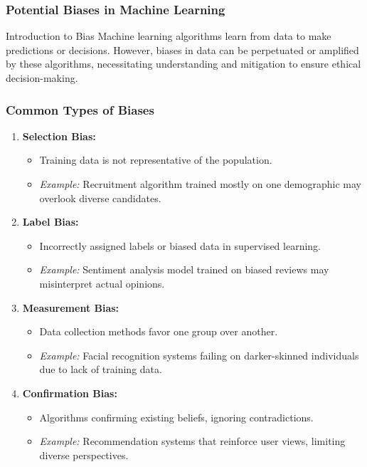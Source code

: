 \documentclass[aspectratio=169]{beamer}
\begin{document}
\begin{frame}[fragile]
    \frametitle{Potential Biases in Machine Learning}
    \begin{block}{Introduction to Bias}
        Machine learning algorithms learn from data to make predictions or decisions. However, biases in data can be perpetuated or amplified by these algorithms, necessitating understanding and mitigation to ensure ethical decision-making.
    \end{block}
\end{frame}

\begin{frame}[fragile]
    \frametitle{Common Types of Biases}
    \begin{enumerate}
        \item \textbf{Selection Bias:}
        \begin{itemize}
            \item Training data is not representative of the population.
            \item \textit{Example:} Recruitment algorithm trained mostly on one demographic may overlook diverse candidates.
        \end{itemize}

        \item \textbf{Label Bias:}
        \begin{itemize}
            \item Incorrectly assigned labels or biased data in supervised learning.
            \item \textit{Example:} Sentiment analysis model trained on biased reviews may misinterpret actual opinions.
        \end{itemize}
        
        \item \textbf{Measurement Bias:}
        \begin{itemize}
            \item Data collection methods favor one group over another.
            \item \textit{Example:} Facial recognition systems failing on darker-skinned individuals due to lack of training data.
        \end{itemize}

        \item \textbf{Confirmation Bias:}
        \begin{itemize}
            \item Algorithms confirming existing beliefs, ignoring contradictions.
            \item \textit{Example:} Recommendation systems that reinforce user views, limiting diverse perspectives.
        \end{itemize}
    \end{enumerate}
\end{frame}
\end{document}
